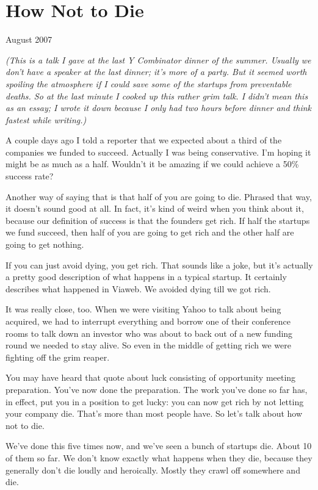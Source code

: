 \documentclass[12pt]{book}
\begin{document}
\chapter{How Not to Die}

August 2007

\emph{(This is a talk I gave at the last Y Combinator dinner of the
summer. Usually we don't have a speaker at the last dinner; it's more of
a party. But it seemed worth spoiling the atmosphere if I could save
some of the startups from preventable deaths. So at the last minute I
cooked up this rather grim talk. I didn't mean this as an essay; I wrote
it down because I only had two hours before dinner and think fastest
while writing.)}

A couple days ago I told a reporter that we expected about a third of
the companies we funded to succeed. Actually I was being conservative.
I'm hoping it might be as much as a half. Wouldn't it be amazing if we
could achieve a 50\% success rate?

Another way of saying that is that half of you are going to die. Phrased
that way, it doesn't sound good at all. In fact, it's kind of weird when
you think about it, because our definition of success is that the
founders get rich. If half the startups we fund succeed, then half of
you are going to get rich and the other half are going to get nothing.

If you can just avoid dying, you get rich. That sounds like a joke, but
it's actually a pretty good description of what happens in a typical
startup. It certainly describes what happened in Viaweb. We avoided
dying till we got rich.

It was really close, too. When we were visiting Yahoo to talk about
being acquired, we had to interrupt everything and borrow one of their
conference rooms to talk down an investor who was about to back out of a
new funding round we needed to stay alive. So even in the middle of
getting rich we were fighting off the grim reaper.

You may have heard that quote about luck consisting of opportunity
meeting preparation. You've now done the preparation. The work you've
done so far has, in effect, put you in a position to get lucky: you can
now get rich by not letting your company die. That's more than most
people have. So let's talk about how not to die.

We've done this five times now, and we've seen a bunch of startups die.
About 10 of them so far. We don't know exactly what happens when they
die, because they generally don't die loudly and heroically. Mostly they
crawl off somewhere and die.
\end{document}
